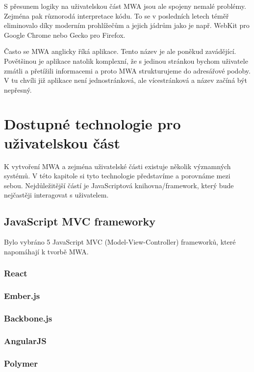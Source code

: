 S přesunem logiky na uživatelskou část MWA jsou ale spojeny nemalé problémy. Zejména pak různorodá interpretace kódu. To se v posledních letech téměř eliminovalo díky moderním prohlížečům a jejich jádrům jako je např. WebKit pro Google Chrome nebo Gecko pro Firefox.

Často se MWA anglicky říká  aplikace\cite{spa}. Tento název je ale poněkud zavádějící. Povětšinou je aplikace natolik komplexní, že s jedinou stránkou bychom uživatele zmátli a přetížili informacemi a proto MWA strukturujeme do adresářové podoby. V tu chvíli již aplikace není jednostránková, ale vícestránková a název začíná být nepřesný.

\section{Dostupné technologie pro uživatelskou část}

K vytvoření MWA a zejména uživatelské části existuje několik významných systémů. V této kapitole si tyto technologie představíme a porovnáme mezi sebou. Nejdůležitější částí je JavaScriptová knihovna/framework, který bude nejčastěji interagovat s uživatelem.

\subsection{JavaScript MVC frameworky}

Bylo vybráno 5 JavaScript MVC (Model-View-Controller)\cite{mvc} frameworků, které napomáhají k tvorbě MWA. 

\subsubsection*{React}
\subsubsection*{Ember.js}
\subsubsection*{Backbone.js}
\subsubsection*{AngularJS}
\subsubsection*{Polymer}

